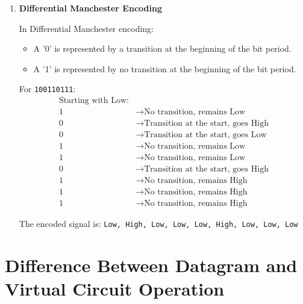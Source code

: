 \documentclass{article}
\begin{document}
\begin{enumerate}[label=\alph*.]
    \item \textbf{Differential Manchester Encoding}
    
    In Differential Manchester encoding:
    \begin{itemize}
        \item A '0' is represented by a transition at the beginning of the bit period.
        \item A '1' is represented by no transition at the beginning of the bit period.
    \end{itemize}

    For \texttt{100110111}:
    \begin{align*}
        \text{Starting with Low:} & \\
        \text{1} &\rightarrow \text{No transition, remains Low} \\
        \text{0} &\rightarrow \text{Transition at the start, goes High} \\
        \text{0} &\rightarrow \text{Transition at the start, goes Low} \\
        \text{1} &\rightarrow \text{No transition, remains Low} \\
        \text{1} &\rightarrow \text{No transition, remains Low} \\
        \text{0} &\rightarrow \text{Transition at the start, goes High} \\
        \text{1} &\rightarrow \text{No transition, remains High} \\
        \text{1} &\rightarrow \text{No transition, remains High} \\
        \text{1} &\rightarrow \text{No transition, remains High}
    \end{align*}

    The encoded signal is: \texttt{Low, High, Low, Low, Low, High, Low, Low, Low}
\end{enumerate}

\section*{Difference Between Datagram and Virtual Circuit Operation}
\end{document}
